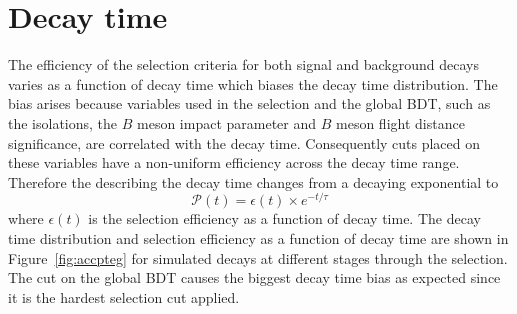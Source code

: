 \section{Decay time \pdfs}
\label{sec:DTpdfs}
The efficiency of the selection criteria for both signal and background decays varies as a function of decay time which biases the decay time distribution. The bias arises because variables used in the selection and the global BDT, such as the isolations, the $B$ meson impact parameter and $B$ meson flight distance significance, are correlated with the decay time. Consequently cuts placed on these variables have a non-uniform efficiency across the decay time range. Therefore the \pdf describing the decay time changes from a decaying exponential to
\begin{equation}
\mathcal{P}(t) = \epsilon(t) \times e^{-t/\tau}
\label{eq:DTpdf}
\end{equation}
where $\epsilon(t)$ is the selection efficiency as a function of decay time. 
The decay time distribution and selection efficiency as a function of decay time are shown in Figure~\ref{fig:accpteg} for simulated \bsmumu decays at different stages through the selection. The cut on the global BDT causes the biggest decay time bias as expected since it is the hardest selection cut applied. %
